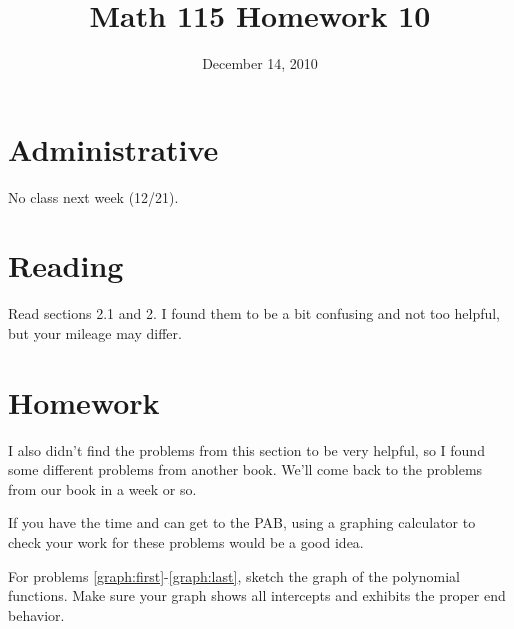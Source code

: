 \documentclass[fleqn,addpoints]{exam}
\title{Math 115 Homework 10}
\date{December 14, 2010}
\begin{document}
\maketitle
 
\ifprintanswers
\else
\section{Administrative}

No class next week (12/21).

\section{Reading}
Read sections 2.1 and 2.  I found them to be a bit confusing and not too helpful, but your mileage may differ.

\fi

\section{Homework}

\ifprintanswers
\else
I also didn't find the problems from this section to be very helpful, so I found some different problems from another
book.  We'll come back to the problems from our book in a week or so.

If you have the time and can get to the PAB, using a graphing calculator to check your work for these problems would be
a good idea.

\makebox[\textwidth]\hrulefill
 
\fi

For problems \ref{graph:first}-\ref{graph:last}, sketch the graph of the polynomial functions.  Make sure your graph
shows all intercepts and exhibits the proper end behavior.
\end{document}
